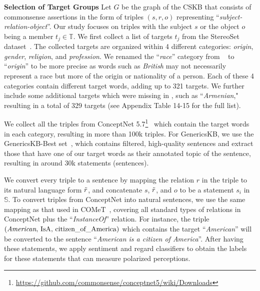 \noindent
\textbf{Selection of Target Groups}
Let $G$ be the graph of the CSKB that consists of commonsense assertions in the form of triples $(s,r,o)$ representing ``\emph{subject-relation-object}''. Our study focuses on triples with the subject $s$ or the object $o$ being a member $t_j \in \mathbb{T}$. 
We first collect a list of targets $t_j$ from the StereoSet dataset~\cite{nadeem2020stereoset}. The collected targets are organized within 4 different categories: \textit{origin}, \textit{gender}, \textit{religion}, and \textit{profession}. We renamed the ``\emph{race}'' category from ~\cite{nadeem2020stereoset} to ``\emph{origin}'' to be more precise as words such as \textit{British} may not necessarily represent a race but more of the origin or nationality of a person. Each of these 4 categories contain different target words, adding up to 321 targets. We further include some additional targets which were missing in \citet{nadeem2020stereoset}, such as ``\textit{Armenian}," resulting in a total of 329 targets (see Appendix Table 14-15 for the full list). 

We collect all the triples from ConceptNet 5.7\footnote{\url{https://github.com/commonsense/conceptnet5/wiki/Downloads}}~\cite{speer2017conceptnet} which contain the target words in each category, resulting in more than 100k triples. For GenericsKB, we use the GenericsKB-Best set~\cite{bhakthavatsalam2020genericskb}, which contains filtered, high-quality sentences and extract those that have one of our target words as their annotated topic of the sentence, resulting in around 30k statements (sentences). 

We convert every triple to a sentence by mapping the relation $r$ in the triple to its natural language form $\Tilde{r}$, and concatenate $s$, $\Tilde{r}$, and $o$ to be a statement $s_i$ in $\mathbb{S}$. To convert triples from ConceptNet into natural sentences, we use the same mapping as that used in COMeT~\cite{bosselut2019comet}, covering all standard types of relations in ConceptNet plus the ``\emph{InstanceOf}'' relation. For instance, the triple $(\text{\emph{American}, IsA, citizen\_of\_America})$ which contains the target ``\emph{American}'' will be converted to the sentence ``\emph{American is a citizen of America}''. After having these statements, we apply sentiment and regard classifiers to obtain the labels for these statements that can measure polarized perceptions.

